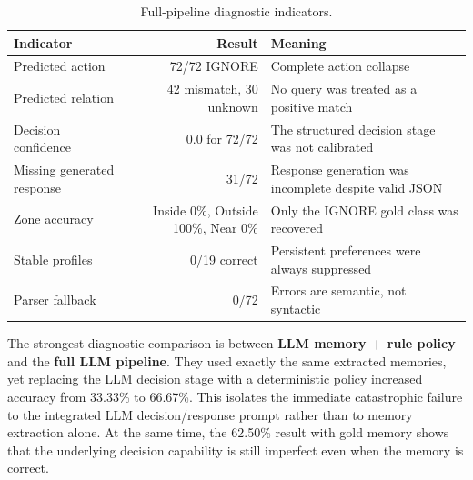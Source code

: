 \documentclass[10pt]{article}
\begin{document}
\begin{table}[H]
\centering
\small
\caption{Full-pipeline diagnostic indicators.}
\begin{tabularx}{0.92\textwidth}{l r X}
\toprule
Indicator & Result & Meaning \\
\midrule
Predicted action & 72/72 IGNORE & Complete action collapse \\
Predicted relation & 42 mismatch, 30 unknown & No query was treated as a positive match \\
Decision confidence & 0.0 for 72/72 & The structured decision stage was not calibrated \\
Missing generated response & 31/72 & Response generation was incomplete despite valid JSON \\
Zone accuracy & Inside 0\%, Outside 100\%, Near 0\% & Only the IGNORE gold class was recovered \\
Stable profiles & 0/19 correct & Persistent preferences were always suppressed \\
Parser fallback & 0/72 & Errors are semantic, not syntactic \\
\bottomrule
\end{tabularx}
\end{table}

The strongest diagnostic comparison is between \textbf{LLM memory + rule policy} and the \textbf{full LLM pipeline}. They used exactly the same extracted memories, yet replacing the LLM decision stage with a deterministic policy increased accuracy from 33.33\% to 66.67\%. This isolates the immediate catastrophic failure to the integrated LLM decision/response prompt rather than to memory extraction alone. At the same time, the 62.50\% result with gold memory shows that the underlying decision capability is still imperfect even when the memory is correct.
\end{document}
